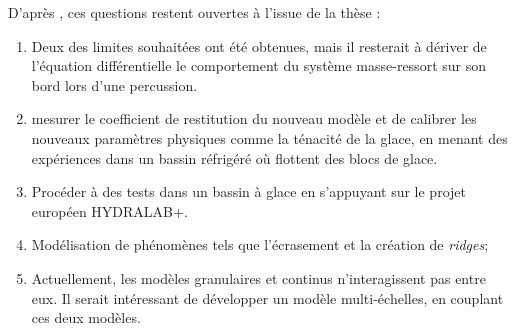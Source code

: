 \documentclass[
  french,
	11pt, %
]{fphw}
\begin{document}
D'après \parencite{balasoiu2020thesis}, ces questions restent ouvertes à l'issue de la thèse :
\begin{enumerate}
  \item Deux des limites souhaitées ont été obtenues, mais il resterait à dériver de l’équation différentielle le comportement du système masse-ressort sur son bord lors d’une percussion.
  \item mesurer le coefficient de restitution du nouveau modèle et de calibrer les nouveaux paramètres physiques comme
  la ténacité de la glace, en menant des expériences dans un bassin réfrigéré où flottent des blocs de glace.
  \item Procéder à des tests dans un bassin à glace en s’appuyant sur le projet européen HYDRALAB+.
  \item Modélisation de phénomènes tels que l’écrasement et la création de \textit{ridges};
  \item Actuellement, les modèles granulaires et continus n’interagissent pas
  entre eux. Il serait intéressant de développer un modèle multi-échelles, en couplant ces deux modèles.
  
\end{enumerate}

\clearpage   %
\printbibliography
\end{document}
